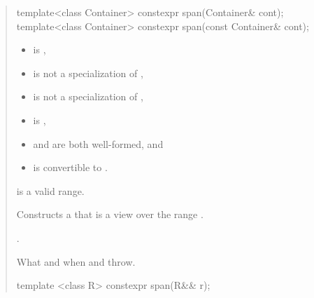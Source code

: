 \documentclass{wg21}
\begin{document}
\begin{quote}
\begin{removedblock}
\begin{itemdecl}
template<class Container> constexpr span(Container& cont);
template<class Container> constexpr span(const Container& cont);
\end{itemdecl}

\begin{itemdescr}
\pnum
\constraints
\begin{itemize}
	\item {} is ,
	\item {} is not a specialization of ,
	\item {} is not a specialization of ,
	\item {} is ,
	\item {} and  are both well-formed, and
	\item {} is convertible to .
\end{itemize}

\pnum
\expects
{} is a valid range.

\pnum
\effects
Constructs a  that is a view over the range .

\pnum
\ensures
{}.

\pnum
\throws
What and when  and  throw.
\end{itemdescr}
\end{removedblock}


\begin{addedblock}
\begin{itemdecl}
template <class R>
constexpr span(R&& r);
\end{itemdecl}
\end{addedblock}


\end{quote}
\end{document}
